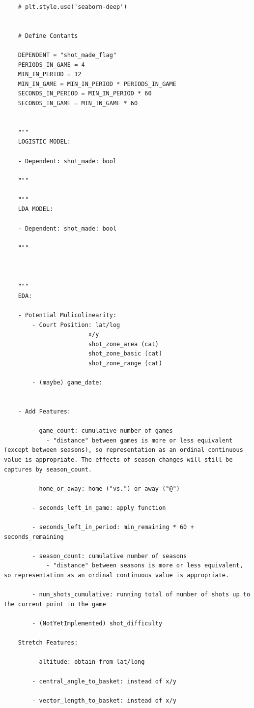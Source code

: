 \begin{verbatim}
    # plt.style.use('seaborn-deep')


    # Define Contants

    DEPENDENT = "shot_made_flag"
    PERIODS_IN_GAME = 4
    MIN_IN_PERIOD = 12
    MIN_IN_GAME = MIN_IN_PERIOD * PERIODS_IN_GAME
    SECONDS_IN_PERIOD = MIN_IN_PERIOD * 60
    SECONDS_IN_GAME = MIN_IN_GAME * 60


    """
    LOGISTIC MODEL:

    - Dependent: shot_made: bool

    """

    """
    LDA MODEL:

    - Dependent: shot_made: bool

    """



    """
    EDA:

    - Potential Mulicolinearity:
        - Court Position: lat/log
                        x/y
                        shot_zone_area (cat)
                        shot_zone_basic (cat)
                        shot_zone_range (cat)

        - (maybe) game_date:


    - Add Features:

        - game_count: cumulative number of games
            - "distance" between games is more or less equivalent (except between seasons), so representation as an ordinal continuous value is appropriate. The effects of season changes will still be captures by season_count.

        - home_or_away: home ("vs.") or away ("@")

        - seconds_left_in_game: apply function

        - seconds_left_in_period: min_remaining * 60 + seconds_remaining

        - season_count: cumulative number of seasons
            - "distance" between seasons is more or less equivalent, so representation as an ordinal continuous value is appropriate.

        - num_shots_cumulative: running total of number of shots up to the current point in the game

        - (NotYetImplemented) shot_difficulty

    Stretch Features:

        - altitude: obtain from lat/long

        - central_angle_to_basket: instead of x/y

        - vector_length_to_basket: instead of x/y


\end{verbatim}
